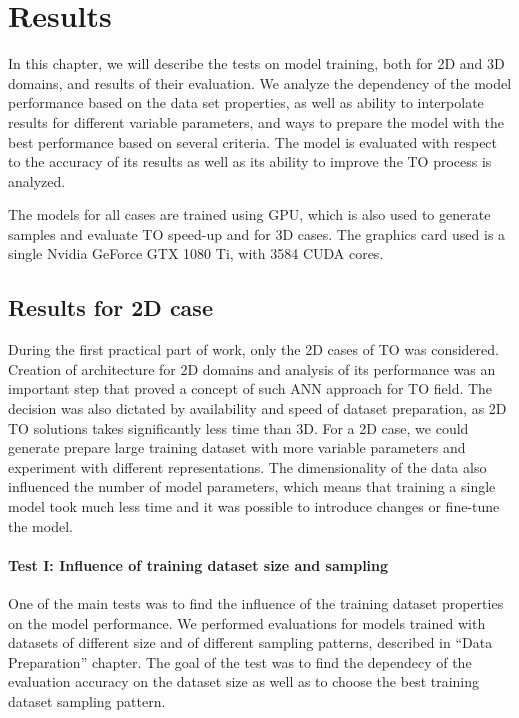 
\chapter{Results}
\label{chapter:Results}

In this chapter, we will describe the tests on model training, both for 2D and 3D domains, and results of their evaluation.
We analyze the dependency of the model performance based on the data set properties, as well as ability to interpolate results for different variable parameters, and ways to prepare the model with the best performance based on several criteria. 
The model is evaluated with respect to the accuracy of its results as well as its ability to improve the TO process is analyzed.
\medskip

The models for all cases are trained using GPU, which is also used to generate samples and evaluate TO speed-up and for 3D cases.
The graphics card used is a single Nvidia GeForce GTX 1080 Ti, with 3584 CUDA cores. 


\section{Results for 2D case}

During the first practical part of work, only the 2D cases of TO was considered.
Creation of architecture for 2D domains and analysis of its performance was an important step that proved a concept of such ANN approach for TO field.
The decision was also dictated by availability and speed of dataset preparation, as 2D TO solutions takes significantly less time than 3D. 
For a 2D case, we could generate prepare large training dataset with more variable parameters and experiment with different representations.
The dimensionality of the data also influenced the number of model parameters, which means that training a single model took much less time and it was possible to introduce changes or fine-tune the model.

\medskip

\subsubsection{Test I: Influence of training dataset size and sampling}
One of the main tests was to find the influence of the training dataset properties on the model performance.
We performed evaluations for models trained with datasets of different size and of different sampling patterns, described in ``Data Preparation'' chapter.
The goal of the test was to find the dependecy of the evaluation accuracy on the dataset size as well as to choose the best training dataset sampling pattern.
\medskip
 
